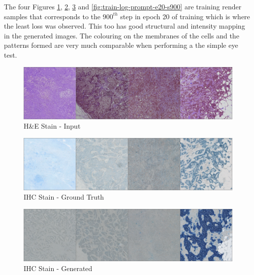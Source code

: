 The four Figures \ref{fig:train-log-source-e20-s900}, \ref{fig:train-log-target-e20-s900}, \ref{fig:train-log-sample-e20-s900} and \ref{fig:train-log-prompt-e20-s900} are training render samples that corresponds to the $900^{th}$ step in epoch 20 of training which is where the least loss was observed. This too has good structural and intensity mapping in the generated images. The colouring on the membranes of the cells and the patterns formed are very much comparable when performing a the simple eye test.
\begin{figure}[h]
    \centering
    \includegraphics[width=1\linewidth]{5_Results/figures/control_gs-020380_e-000020_b-000900.png}
    \caption[Input H\&E images for train log at e=20, steps=900]{H\&E Stain - Input}
    \label{fig:train-log-source-e20-s900}
\end{figure}
\begin{figure}[h]
    \centering
    \includegraphics[width=1\linewidth]{5_Results/figures/reconstruction_gs-020380_e-000020_b-000900.png}
    \caption[Target IHC images for train log at e=20, steps=900]{IHC Stain - Ground Truth}
    \label{fig:train-log-target-e20-s900}
\end{figure}
\begin{figure}[h]
    \centering
    \includegraphics[width=1\linewidth]{5_Results/figures/samples_cfg_scale_9.00_gs-020380_e-000020_b-000900.png}
    \caption[Generated IHC images for train log at e=20, steps=900]{IHC Stain - Generated}
    \label{fig:train-log-sample-e20-s900}
\end{figure}
